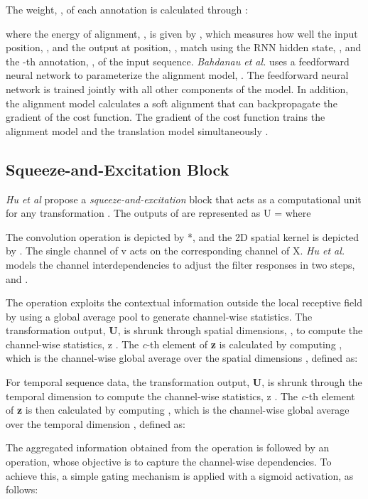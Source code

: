 \documentclass[preprint,12pt,3p]{elsarticle}
\begin{document}
The weight, , of each annotation is calculated through : 


where the energy of alignment, , is given by , which measures how well the input position, , and the output at position, , match using the RNN hidden state, , and the -th annotation, , of the input sequence. \textit{Bahdanau et al.}\cite{bahdanau2014neural} uses a feedforward neural network to parameterize the alignment model, . The feedforward neural network is trained jointly with all other components of the model. In addition, the alignment model calculates a soft alignment that can backpropagate the gradient of the cost function. The gradient of the cost function trains the alignment model and the translation model simultaneously \cite{bahdanau2014neural}. 


\subsection{Squeeze-and-Excitation Block}
\textit{Hu  et al} \cite{hu2017squeeze} propose a  \textit{squeeze-and-excitation} block that acts as a computational unit for any transformation . The outputs of  are represented as U =  where 

The convolution operation is depicted by *, and the 2D spatial kernel is depicted by . The single channel of v acts on the corresponding channel of X. \textit{Hu  et al.} \cite{hu2017squeeze} models the channel interdependencies to adjust the filter responses in two steps,  and . 

The  operation exploits the contextual information outside the local receptive field by using a global average pool to generate channel-wise statistics. The transformation output, \textbf{U}, is shrunk through spatial dimensions, , to compute the channel-wise statistics, z . The \textit{c}-th element of \textbf{z} is calculated by computing , which is the channel-wise global average over the spatial dimensions , defined as:

For temporal sequence data, the transformation output, \textbf{U}, is shrunk through the temporal dimension  to compute the channel-wise statistics, z . The \textit{c}-th element of  \textbf{z} is then calculated by computing , which is the channel-wise global average over the temporal dimension , defined as:


The aggregated information obtained from the  operation is followed by an  operation, whose objective is to capture the channel-wise dependencies. To achieve this, a simple gating mechanism is applied with a sigmoid activation, as follows:
\end{document}
